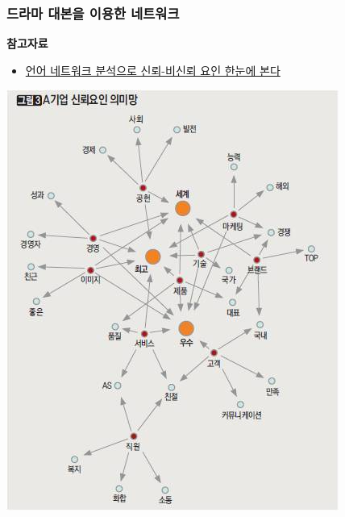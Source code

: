 \documentclass{beamer}
\begin{document}
\begin{frame}[fragile]
\frametitle{드라마 대본을 이용한 네트워크}
\textbf{참고자료}
\begin{itemize}
\item \href{http://www.hscoaching.com/301}{언어 네트워크 분석으로 신뢰-비신뢰 요인 한눈에 본다}
\end{itemize}
\begin{center}
\includegraphics[scale=0.4]{hscoaching_2.jpg}
\end{center}
\end{frame}
\end{document}

